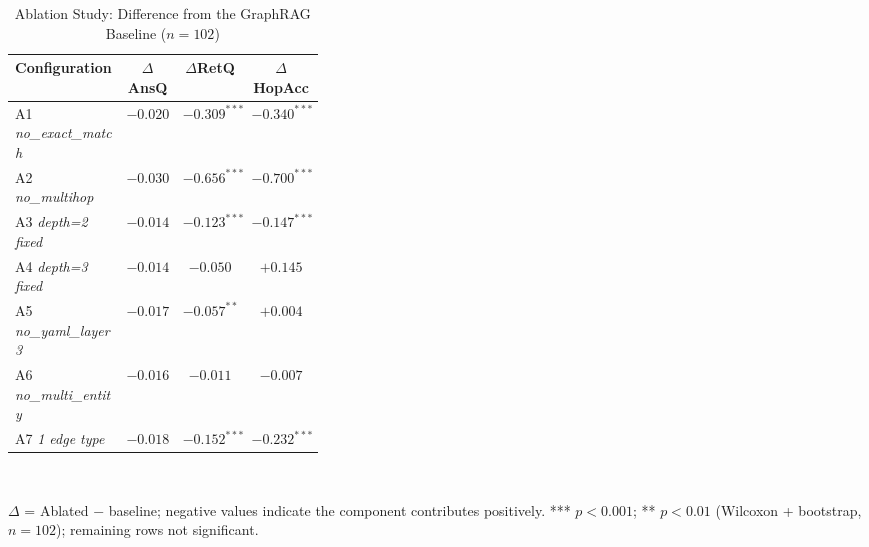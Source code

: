\begin{table}[t]
\caption{Ablation Study: Difference from the GraphRAG Baseline ($n=102$)}
\label{tbl:ablasi}
\centering
\begin{footnotesize}
\begin{tabular}{|p{0.36\linewidth}|c|c|c|}
\hline
\textbf{Configuration} & \textbf{$\Delta$AnsQ} & \textbf{$\Delta$RetQ} & \textbf{$\Delta$HopAcc} \\
\hline
A1 \textit{no\_exact\_match} & $-0.020$ & $-0.309^{***}$ & $-0.340^{***}$ \\
\hline
A2 \textit{no\_multihop} & $-0.030$ & $-0.656^{***}$ & $-0.700^{***}$ \\
\hline
A3 \textit{depth=2 fixed} & $-0.014$ & $-0.123^{***}$ & $-0.147^{***}$ \\
\hline
A4 \textit{depth=3 fixed} & $-0.014$ & $-0.050$ & $+0.145$ \\
\hline
A5 \textit{no\_yaml\_layer3} & $-0.017$ & $-0.057^{**}$ & $+0.004$ \\
\hline
A6 \textit{no\_multi\_entity} & $-0.016$ & $-0.011$ & $-0.007$ \\
\hline
A7 \textit{1 edge type} & $-0.018$ & $-0.152^{***}$ & $-0.232^{***}$ \\
\hline
\end{tabular}
\\[4pt]
{\footnotesize \raggedright $\Delta$ = Ablated $-$ baseline; negative values indicate the component contributes positively. *** $p<0.001$; ** $p<0.01$ (Wilcoxon + bootstrap, $n=102$); remaining rows not significant.\par}
\end{footnotesize}
\end{table}
